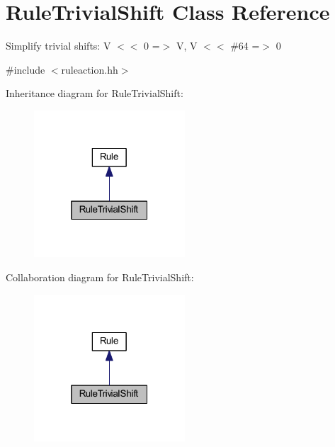 \hypertarget{class_rule_trivial_shift}{}\section{Rule\+Trivial\+Shift Class Reference}
\label{class_rule_trivial_shift}


Simplify trivial shifts\+: {\ttfamily V $<$$<$ 0 =$>$ V, V $<$$<$ \#64 =$>$ 0}  




{\ttfamily \#include $<$ruleaction.\+hh$>$}



Inheritance diagram for Rule\+Trivial\+Shift\+:
\nopagebreak
\begin{figure}[H]
\begin{center}
\leavevmode
\includegraphics[width=160pt]{class_rule_trivial_shift__inherit__graph}
\end{center}
\end{figure}


Collaboration diagram for Rule\+Trivial\+Shift\+:
\nopagebreak
\begin{figure}[H]
\begin{center}
\leavevmode
\includegraphics[width=160pt]{class_rule_trivial_shift__coll__graph}
\end{center}
\end{figure}
